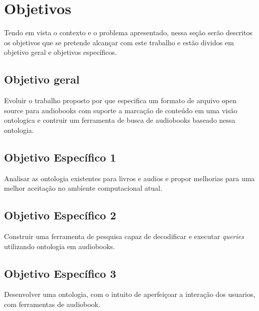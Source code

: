 \chapter{Objetivos}\label{cap2}

Tendo em vista o contexto e o problema apresentado, nessa seção serão descritos os objetivos que se pretende alcançar com este trabalho e estão dividos em objetivo geral e objetivos específicos.

\section{Objetivo geral}

Evoluir o trabalho proposto por \cite{herbert} que especifica um formato de arquivo open source para audiobooks com suporte a marcação de conteúdo em uma visão ontologica e contruir um ferramenta de busca de audiobooks baseado nessa ontologia.

\section{Objetivo Específico 1}

Analisar as ontologia existentes para livros e audios e propor melhorias para uma melhor aceitação no ambiente computacional atual.

\section{Objetivo Específico 2}

Construir uma ferramenta de pesquisa capaz de decodificar e executar \textit{queries} utilizando ontologia em audiobooks.

\section{Objetivo Específico 3}

Desenvolver uma ontologia, com o intuito de aperfeiçoar a interação dos usuarios, com ferramentas de audiobook.



 





